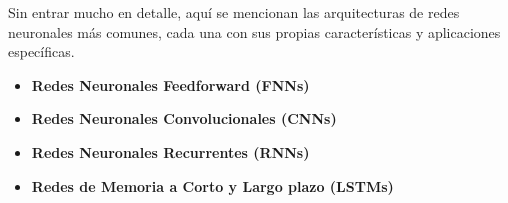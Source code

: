 Sin entrar mucho en detalle, aquí se mencionan las arquitecturas de redes neuronales más comunes, cada una con sus propias características y aplicaciones específicas.

\begin{itemize}
    \item \textbf{Redes Neuronales Feedforward (FNNs)}
    \item \textbf{Redes Neuronales Convolucionales (CNNs)}
    \item \textbf{Redes Neuronales Recurrentes (RNNs)}
    \item \textbf{Redes de Memoria a Corto y Largo plazo (LSTMs)}
\end{itemize}
